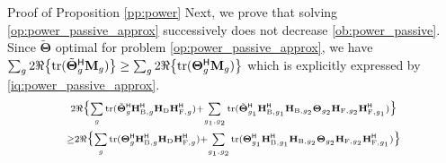 \begin{appendix}
\begin{subsection}{Proof of Proposition \ref{pp:power}}
Next, we prove that solving \eqref{op:power_passive_approx} successively does not decrease \eqref{ob:power_passive}.
Since $\tilde{\mathbf{\Theta}}$ optimal for problem \eqref{op:power_passive_approx}, we have $\sum_g 2 \Re\bigl\{ \operatorname{tr}(\tilde{\mathbf{\Theta}}_g^\mathsf{H} \mathbf{M}_g) \bigr\} \ge \sum_g 2 \Re\bigl\{ \operatorname{tr}(\mathbf{\Theta}_g^\mathsf{H} \mathbf{M}_g) \bigr\}$ which is explicitly expressed by \eqref{iq:power_passive_approx}.
\begin{multline}
	\label{iq:power_passive_approx}
	\scriptstyle{2 \Re \bigl\{\sum\limits_g \operatorname{tr}(\tilde{\mathbf{\Theta}}_g^\mathsf{H} \mathbf{H}_{\mathrm{B},g}^\mathsf{H} \mathbf{H}_\mathrm{D} \mathbf{H}_{\mathrm{F},g}^\mathsf{H}) + \sum\limits_{g_1,g_2} \operatorname{tr}(\tilde{\mathbf{\Theta}}_{g_1}^\mathsf{H} \mathbf{H}_{\mathrm{B},g_1}^\mathsf{H} \mathbf{H}_{\mathrm{B},g_2} \mathbf{\Theta}_{g_2} \mathbf{H}_{\mathrm{F},g_2} \mathbf{H}_{\mathrm{F},g_1}^\mathsf{H})\bigr\}} \\
	\scriptstyle{\ge 2 \Re \bigl\{\sum\limits_g \operatorname{tr}({\mathbf{\Theta}}_g^\mathsf{H} \mathbf{H}_{\mathrm{B},g}^\mathsf{H} \mathbf{H}_\mathrm{D} \mathbf{H}_{\mathrm{F},g}^\mathsf{H}) + \sum\limits_{g_1,g_2} \operatorname{tr}({\mathbf{\Theta}}_{g_1}^\mathsf{H} \mathbf{H}_{\mathrm{B},g_1}^\mathsf{H} \mathbf{H}_{\mathrm{B},g_2} \mathbf{\Theta}_{g_2} \mathbf{H}_{\mathrm{F},g_2} \mathbf{H}_{\mathrm{F},g_1}^\mathsf{H})\bigr\}}
\end{multline}

\end{subsection}
\end{appendix}
